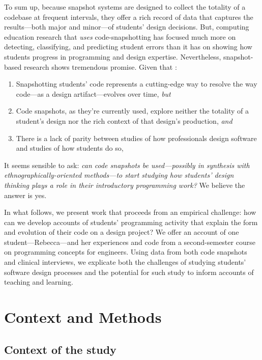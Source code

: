 To sum up, because snapshot systems are designed to collect the totality
of a codebase at frequent intervals, they offer a rich record of data
that captures the results---both major and minor---of students' design
decisions. But, computing education research that \emph{uses}
code-snapshotting has focused much more on detecting, classifying, and
predicting student errors than it has on showing how students progress
in programming and design expertise. Nevertheless, snapshot-based
research shows tremendous promise. Given that :

\begin{enumerate}
\def\labelenumi{\arabic{enumi}.}
\tightlist
\item
  Snapshotting students' code represents a cutting-edge way to resolve
  the way code---as a design artifact---evolves over time, \emph{but}
\item
  Code snapshots, as they're currently used, explore neither the
  totality of a student's design nor the rich context of that design's
  production, \emph{and}
\item
  There is a lack of parity between studies of how professionals design
  software and studies of how students do so,
\end{enumerate}

It seems sensible to ask: \emph{can code snapshots be used---possibly in
synthesis with ethnographically-oriented methods---to start studying how
students' design thinking plays a role in their introductory programming
work?} We believe the answer is yes.

In what follows, we present work that proceeds from an empirical
challenge: how can we develop accounts of students' programming activity
that explain the form and evolution of their code on a design project?
We offer an account of one student---Rebecca---and her experiences and
code from a second-semester course on programming concepts for
engineers. Using data from both code snapshots and clinical interviews,
we explicate both the challenges of studying students' software design
processes and the potential for such study to inform accounts of
teaching and learning.

\section{Context and Methods}\label{context-and-methods}

\subsection{Context of the study}\label{context-of-the-study}

